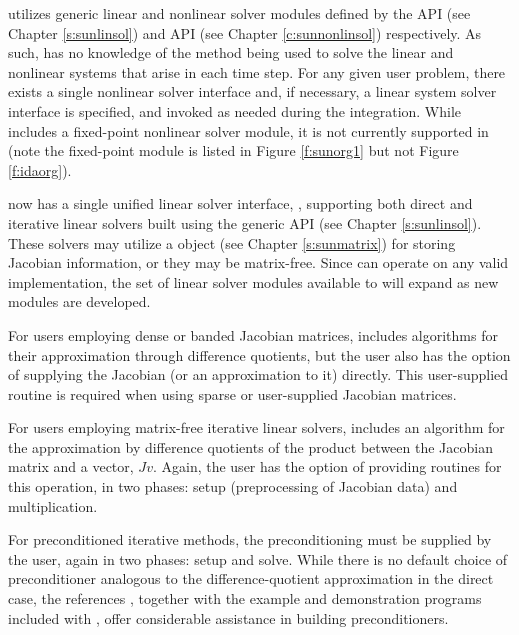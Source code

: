 {\ida} utilizes generic linear and nonlinear solver modules defined by the
{\sunlinsol} API (see Chapter \ref{s:sunlinsol}) and {\sunnonlinsol} API (see
Chapter \ref{c:sunnonlinsol}) respectively. As such, {\ida} has no knowledge
of the method being used to solve the linear and nonlinear systems that
arise in each time step. For any given user problem, there exists a single
nonlinear solver interface and, if necessary, a linear system solver
interface is specified, and invoked as needed during the integration. While
{\sundials} includes a fixed-point nonlinear solver module, it is not currently
supported in {\ida} (note the fixed-point module is listed in Figure
\ref{f:sunorg1} but not Figure \ref{f:idaorg}).

{\ida} now has a single unified linear solver interface, {\idals},
supporting both direct and iterative linear solvers built using the
generic {\sunlinsol} API (see Chapter \ref{s:sunlinsol}).  These
solvers may utilize a {\sunmatrix} object (see Chapter
\ref{s:sunmatrix}) for storing Jacobian information, or they may be
matrix-free.  Since {\ida} can operate on any valid {\sunlinsol}
implementation, the set of linear solver modules available to {\ida}
will expand as new {\sunlinsol} modules are developed.

For users employing dense or banded Jacobian matrices, {\idals}
includes algorithms for their approximation through difference 
quotients, but the user also has the option of supplying the Jacobian
(or an approximation to it) directly.  This user-supplied 
routine is required when using sparse or user-supplied Jacobian
matrices.

For users employing matrix-free iterative linear solvers, {\idals}
includes an algorithm for the approximation by difference quotients of
the product between the Jacobian matrix and a vector, $Jv$. Again, the
user has the option of providing routines for this operation, in two
phases: setup (preprocessing of Jacobian data) and multiplication.

For preconditioned iterative methods,  
the preconditioning must be supplied by the user, again in two phases: 
setup and solve.  While there is no
default choice of preconditioner analogous to the difference-quotient
approximation in the direct case, the references
\cite{BrHi:89,Byr:92}, together with the example and demonstration
programs included with {\ida}, offer considerable assistance in
building preconditioners. 

